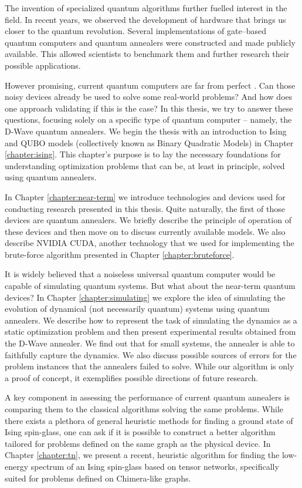 The invention of specialized quantum algorithms further fuelled interest in the
field. In recent years, we observed the development of hardware that brings us
closer to the quantum revolution. Several implementations of gate--based
quantum computers \cite{ionq, bohnet} and quantum annealers \cite{johnson,
  dattani} were constructed and made publicly available. This allowed scientists
to benchmark them and further research their possible applications.

However promising, current quantum computers are far from perfect
\cite{pitfalls,preskill}. Can those noisy devices already be used to solve some
real-world problems? And how does one approach validating if this is the case?
In this thesis, we try to answer these questions, focusing solely on a specific
type of quantum computer -- namely, the D-Wave quantum annealers. We begin the
thesis with an introduction to Ising and QUBO models (collectively known as
Binary Quadratic Models) in Chapter \ref{chapter:ising}. This chapter's purpose
is to lay the necessary foundations for understanding optimization problems
that can be, at least in principle, solved using quantum annealers.

In Chapter \ref{chapter:near-term} we introduce technologies and devices used
for conducting research presented in this thesis. Quite naturally, the first of
those devices are quantum annealers. We briefly describe the principle of
operation of these devices and then move on to discuss currently available
models. We also describe NVIDIA CUDA, another technology that we used for
implementing the brute-force algorithm presented in Chapter
\ref{chapter:bruteforce}.

It is widely believed that a noiseless universal quantum computer would be
capable of simulating quantum systems. But what about the near-term quantum
devices? In Chapter \ref{chapter:simulating} we explore the idea of simulating
the evolution of dynamical (not necessarily quantum) systems using quantum
annealers. We describe how to represent the task of simulating the dynamics as
a static optimization problem and then present experimental results obtained
from the D-Wave annealer. We find out that for small systems, the annealer is
able to faithfully capture the dynamics. We also discuss possible sources of
errors for the problem instances that the annealers failed to solve. While our
algorithm is only a proof of concept, it exemplifies possible directions of
future research.

A key component in assessing the performance of current quantum annealers is
comparing them to the classical algorithms solving the same problems. While
there exists a plethora of general heuristic methods for finding a ground state
of Ising spin-glass, one can ask if it is possible to construct a better
algorithm tailored for problems defined on the same graph as the physical
device. In Chapter \ref{chapter:tn}, we present a recent, heuristic algorithm
for finding the low-energy spectrum of an Ising spin-glass based on tensor
networks, specifically suited for problems defined on Chimera-like graphs.

